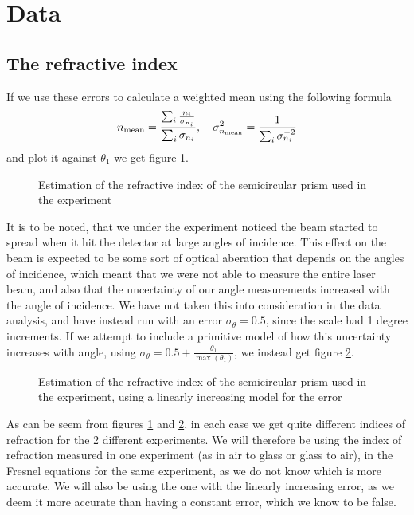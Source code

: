 \section{Data}
\subsection{The refractive index}
If we use these errors to calculate a weighted mean using the following formula
\[n_{\textup{mean}} = \frac{\sum_i \frac{n_i}{\sigma_{n_i}}}{\sum_i \sigma_{n_i}}, \quad \sigma_{n_\text{mean}}^2 = \frac{1}{\sum_i \sigma_{n_i}^{-2}}\]
and plot it against $\theta_1$ we get figure \ref{fig:weighted_average}.
   \begin{figure}[h]
        
        \centering
        \caption{Estimation of the refractive index of the semicircular prism used in the experiment}
        \label{fig:weighted_average}
    \end{figure}
It is to be noted, that we under the experiment noticed the beam started to spread when it hit the detector at large angles of incidence. This effect on the beam is expected to be some sort of optical aberation that depends on the angles of incidence, which meant that we were not able to measure the entire laser beam, and also that the uncertainty of our angle measurements increased with the angle of incidence.
We have not taken this into consideration in the data analysis, and have instead run with an error $\sigma_\theta = 0.5$, since the scale had 1 degree increments. 
If we attempt to include a primitive model of how this uncertainty increases with angle, using $\sigma_\theta = 0.5 + \frac{\theta_1}{\max(\theta_1)}$, we instead get figure \ref{fig:new_weighted_average}.
   \begin{figure}[h]
        
        \centering
        \caption{Estimation of the refractive index of the semicircular prism used in the experiment, using a linearly increasing model for the error}
        \label{fig:new_weighted_average}
    \end{figure}
As can be seem from figures \ref{fig:weighted_average} and \ref{fig:new_weighted_average}, in each case we get quite different indices of refraction for the 2 different experiments.
We will therefore be using the index of refraction measured in one experiment (as in air to glass or glass to air), in the Fresnel equations for the same experiment, as we do not know which is more accurate. We will also be using the one with the linearly increasing error, as we deem it more accurate than having a constant error, which we know to be false.

